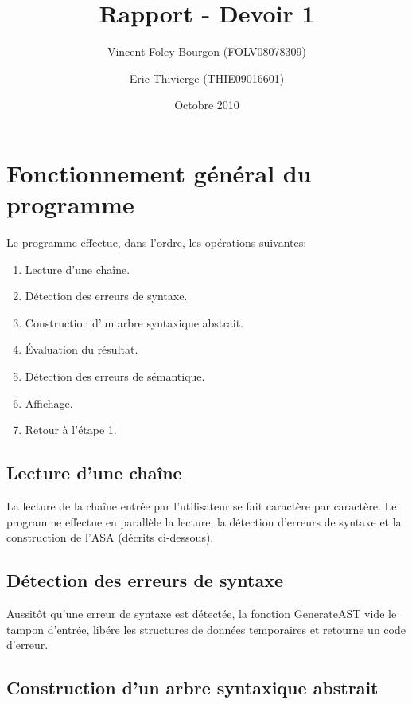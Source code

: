 \documentclass[10pt]{report}
\begin{document}
\title{Rapport - Devoir 1}
\date{Octobre 2010}
\author{Vincent Foley-Bourgon (FOLV08078309) \and
  Eric Thivierge (THIE09016601)}

\maketitle

\section{Fonctionnement général du programme}

Le programme effectue, dans l'ordre, les opérations suivantes:

\begin{enumerate}
  \item Lecture d'une chaîne.
  \item Détection des erreurs de syntaxe.
  \item Construction d'un arbre syntaxique abstrait.
  \item Évaluation du résultat.
  \item Détection des erreurs de sémantique.
  \item Affichage.
  \item Retour à l'étape 1.
\end{enumerate}


\subsection{Lecture d'une chaîne}

La lecture de la chaîne entrée par l'utilisateur se fait caractère par
caractère.  Le programme effectue en parallèle la lecture, la détection
d'erreurs de syntaxe et la construction de l'ASA (décrits ci-dessous).

\subsection{Détection des erreurs de syntaxe}

Aussitôt qu'une erreur de syntaxe est détectée, la fonction GenerateAST vide
le tampon d'entrée, libére les structures de données temporaires et retourne
un code d'erreur.

\subsection{Construction d'un arbre syntaxique abstrait}
\end{document}
